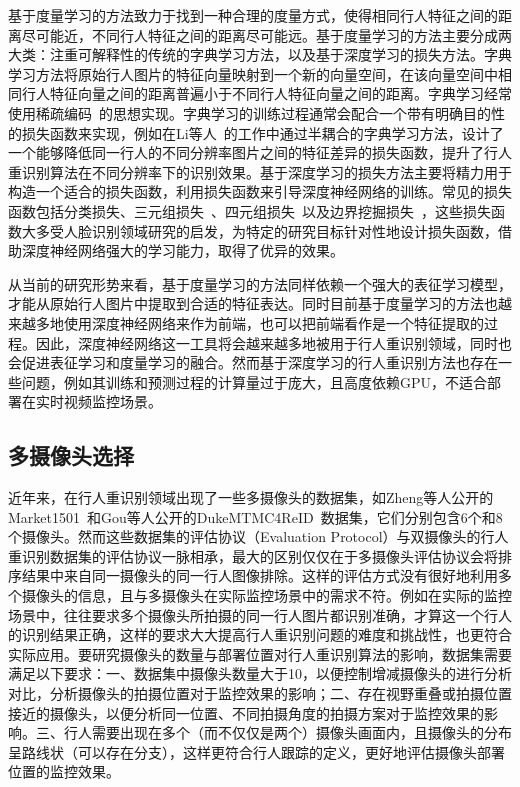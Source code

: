 基于度量学习的方法致力于找到一种合理的度量方式，使得相同行人特征之间的距离尽可能近，不同行人特征之间的距离尽可能远。基于度量学习的方法主要分成两大类：注重可解释性的传统的字典学习方法，以及基于深度学习的损失方法。字典学习方法将原始行人图片的特征向量映射到一个新的向量空间，在该向量空间中相同行人特征向量之间的距离普遍小于不同行人特征向量之间的距离。字典学习经常使用稀疏编码~\cite{lee2007efficient}的思想实现。字典学习的训练过程通常会配合一个带有明确目的性的损失函数来实现，例如在Li等人~\cite{li2018discriminative}的工作中通过半耦合的字典学习方法，设计了一个能够降低同一行人的不同分辨率图片之间的特征差异的损失函数，提升了行人重识别算法在不同分辨率下的识别效果。基于深度学习的损失方法主要将精力用于构造一个适合的损失函数，利用损失函数来引导深度神经网络的训练。常见的损失函数包括分类损失、三元组损失~\cite{schroff2015facenet}、四元组损失~\cite{chen2017beyond}以及边界挖掘损失~\cite{xiao2017margin}，这些损失函数大多受人脸识别领域研究的启发，为特定的研究目标针对性地设计损失函数，借助深度神经网络强大的学习能力，取得了优异的效果。

从当前的研究形势来看，基于度量学习的方法同样依赖一个强大的表征学习模型，才能从原始行人图片中提取到合适的特征表达。同时目前基于度量学习的方法也越来越多地使用深度神经网络来作为前端，也可以把前端看作是一个特征提取的过程。因此，深度神经网络这一工具将会越来越多地被用于行人重识别领域，同时也会促进表征学习和度量学习的融合。然而基于深度学习的行人重识别方法也存在一些问题，例如其训练和预测过程的计算量过于庞大，且高度依赖GPU，不适合部署在实时视频监控场景。

\subsection{多摄像头选择}

近年来，在行人重识别领域出现了一些多摄像头的数据集，如Zheng等人公开的Market1501~\cite{zheng2015scalable}和Gou等人公开的DukeMTMC4ReID~\cite{gou2017dukemtmc4reid}数据集，它们分别包含6个和8个摄像头。然而这些数据集的评估协议（Evaluation Protocol）与双摄像头的行人重识别数据集的评估协议一脉相承，最大的区别仅仅在于多摄像头评估协议会将排序结果中来自同一摄像头的同一行人图像排除。这样的评估方式没有很好地利用多个摄像头的信息，且与多摄像头在实际监控场景中的需求不符。例如在实际的监控场景中，往往要求多个摄像头所拍摄的同一行人图片都识别准确，才算这一个行人的识别结果正确，这样的要求大大提高行人重识别问题的难度和挑战性，也更符合实际应用。要研究摄像头的数量与部署位置对行人重识别算法的影响，数据集需要满足以下要求：一、数据集中摄像头数量大于10，以便控制增减摄像头的进行分析对比，分析摄像头的拍摄位置对于监控效果的影响；二、存在视野重叠或拍摄位置接近的摄像头，以便分析同一位置、不同拍摄角度的拍摄方案对于监控效果的影响。三、行人需要出现在多个（而不仅仅是两个）摄像头画面内，且摄像头的分布呈路线状（可以存在分支），这样更符合行人跟踪的定义，更好地评估摄像头部署位置的监控效果。

